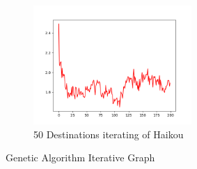 \documentclass{llncs}
\begin{document}
\begin{figure}[htbp]
\begin{subfigure}[t]{0.45\textwidth}
		\begin{minipage}{6cm}
			\centering
			\includegraphics[width=6cm]{figures/hk_50.png}
			\caption{50 Destinations iterating of Haikou}
		\end{minipage}
	\end{subfigure}
	\caption{Genetic Algorithm Iterative Graph}
	\label{fig-it}
\end{figure}
\end{document}

